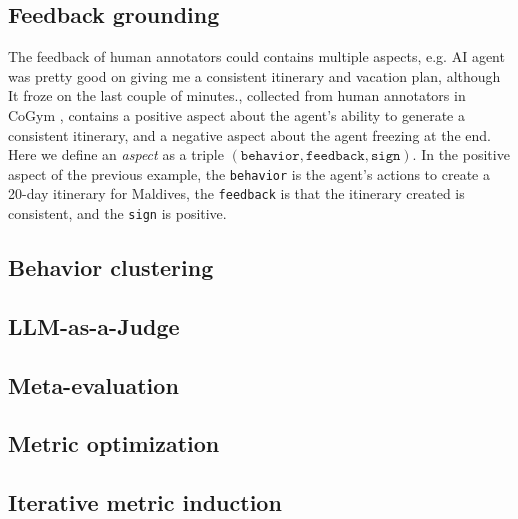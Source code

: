 \subsection{Feedback grounding}
\label{sec:grounding}
The feedback of human annotators could contains multiple aspects, e.g. \textsf{AI agent was pretty good
on giving me a consistent itinerary and vacation plan, although It froze on the last couple of minutes.},
collected from human annotators in CoGym \citep{shao2024collaborative}, contains a positive aspect
about the agent's ability to generate a consistent itinerary, and a negative aspect about the agent freezing
at the end. Here we define an \emph{aspect} as a triple $(\texttt{behavior}, \texttt{feedback}, \texttt{sign})$.
In the positive aspect of the previous example, the \texttt{behavior} is the agent's actions to create
a 20-day itinerary for Maldives, the \texttt{feedback} is that the itinerary created is consistent, 
and the \texttt{sign} is positive. 



\subsection{Behavior clustering}
\label{sec:clustering}

\subsection{LLM-as-a-Judge}
\label{sec:llm-judge}

\subsection{Meta-evaluation}
\label{sec:meta-evaluation}

\subsection{Metric optimization}
\label{sec:metric-optimization}

\subsection{Iterative metric induction}
\label{sec:iterative-induction}